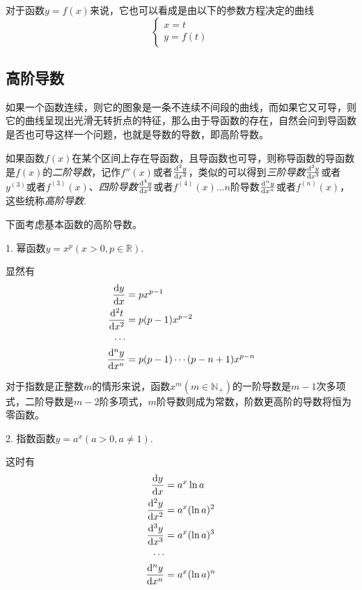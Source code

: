 对于函数$y=f(x)$来说，它也可以看成是由以下的参数方程决定的曲线
\[
  \begin{cases}
    x = t \\
    y = f(t)
  \end{cases}
\]

\subsection{高阶导数}
\label{sec:high-level-derivative}

如果一个函数连续，则它的图象是一条不连续不间段的曲线，而如果它又可导，则它的曲线呈现出光滑无转折点的特征，那么由于导函数的存在，自然会问到导函数是否也可导这样一个问题，也就是导数的导数，即高阶导数。

\begin{definition}
  如果函数$f(x)$在某个区间上存在导函数，且导函数也可导，则称导函数的导函数是$f(x)$的\emph{二阶导数}，记作$f''(x)$或者$\frac{\mathop{}\!\mathrm{d}^2y}{\mathop{}\!\mathrm{d} x^2}$，类似的可以得到\emph{三阶导数}$\frac{\mathop{}\!\mathrm{d}^3y}{\mathop{}\!\mathrm{d} x^3}$或者$y^{(3)}$或者$f^{(3)}(x)$、\emph{四阶导数}$\frac{\mathop{}\!\mathrm{d}^4 y}{\mathop{}\!\mathrm{d} x^4}$或者$f^{(4)}(x)$...$n$阶导数$\frac{\mathop{}\!\mathrm{d}^n y}{\mathop{}\!\mathrm{d} x^n}$或者$f^{(n)}(x)$，这些统称\emph{高阶导数}.
\end{definition}

下面考虑基本函数的高阶导数。

1. 幂函数$y=x^p(x>0, p \in \mathbb{R})$.

显然有
\begin{align*}
  \frac{\mathop{}\!\mathrm{d} y}{\mathop{}\!\mathrm{d} x} & = px^{p-1} \\
  \frac{\mathop{}\!\mathrm{d}^2 t}{\mathop{}\!\mathrm{d} x^2} & = p(p-1)x^{p-2} \\
  \cdots \\
  \frac{\mathop{}\!\mathrm{d} ^n y}{\mathop{}\!\mathrm{d} x^n} & = p(p-1)\cdots (p-n+1)x^{p-n}
\end{align*}

对于指数是正整数$m$的情形来说，函数$x^m(m \in \mathbb{N}_+)$的一阶导数是$m-1$次多项式，二阶导数是$m-2$阶多项式，$m$阶导数则成为常数，阶数更高阶的导数将恒为零函数。

2. 指数函数$y=a^x(a>0,a \neq 1)$.

这时有
\begin{align*}
  \frac{\dif y}{\dif x} & = a^x \ln{a} \\
  \frac{\dif^2 y}{\dif x^2} & = a^x (\ln{a})^2 \\
  \frac{\dif^3 y}{\dif x^3} & = a^x (\ln{a})^3 \\
  \cdots \\
  \frac{\dif^n y}{\dif x^n} & = a^x (\ln{a})^n \\
\end{align*}

